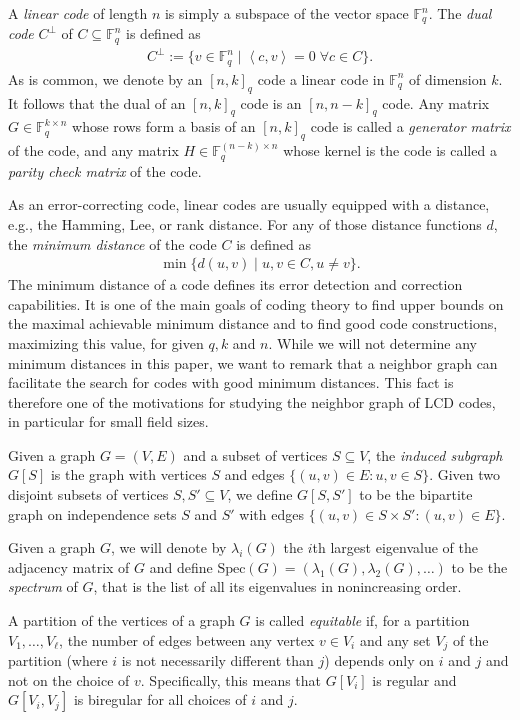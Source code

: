 \documentclass[11pt]{article}
\theoremstyle{definition}
\newcommand{\F}{\mathbb{F}}
\newcommand{\Spec}{\mathrm{Spec}}
\newcommand{\Ang}[1]{\left\langle#1\right\rangle}
\begin{document}
A \emph{linear code} of length $n$ is simply a subspace of the vector space $\F_q^n$.
The \emph{dual code} $C^\perp$ of $C \subseteq \F_q^n$ is defined as
\begin{align*}
	C^\perp := \{v\in \F_q^n \mid \Ang{c, v}=0 \; \forall c\in C\}.
\end{align*}
As is common, we denote by an ${[n, k]}_q$ code a linear code in $\F_q^n$ of dimension $k$.
It follows that the dual of an ${[n, k]}_q$ code is an ${[n, n - k]}_q$ code.
Any matrix $G\in \F_q^{k\times n}$ whose rows form a basis of an ${[n, k]}_q$ code is called a \emph{generator matrix} of the code, and any matrix $H \in \F_q^{(n - k) \times n}$ whose kernel is the code is called a \emph{parity check matrix} of the code.

As an error-correcting code, linear codes are usually equipped with a distance, e.g., the Hamming, Lee, or rank distance.
For any of those distance functions $d$, the \emph{minimum distance} of the code $C$ is defined as 
\begin{align*}
	\min\{d(u, v) \mid u,v \in C, u\neq v\}.
\end{align*}
The minimum distance of a code defines its error detection and correction capabilities.
It is one of the main goals of coding theory to find upper bounds on the maximal achievable minimum distance and to find good code constructions, maximizing this value, for given $q,k$ and $n$.
While we will not determine any minimum distances in this paper, we want to remark that a neighbor graph can facilitate the search for codes with good minimum distances.
This fact is therefore one of the motivations for studying the neighbor graph of LCD codes, in particular for small field sizes.

Given a graph $G = (V, E)$ and a subset of vertices $S \subseteq V$, the \emph{induced subgraph} $G[S]$ is the graph with vertices $S$ and edges $\{(u, v) \in E : u, v \in S\}$.
Given two disjoint subsets of vertices $S, S' \subseteq V$, we define $G[S, S']$ to be the bipartite graph on independence sets $S$ and $S'$ with edges $\{(u, v) \in S \times S' : (u, v) \in E\}$.

Given a graph $G$, we will denote by $\lambda_i(G)$ the $i$th largest eigenvalue of the adjacency matrix of $G$ and define $\Spec(G) = (\lambda_1(G), \lambda_2(G), \ldots)$ to be the \emph{spectrum} of $G$, that is the list of all its eigenvalues in nonincreasing order.

A partition of the vertices of a graph $G$ is called \emph{equitable} if, for a partition $V_1, \ldots, V_\ell$, the number of edges between any vertex $v \in V_i$ and any set $V_j$ of the partition (where $i$ is not necessarily different than $j$) depends only on $i$ and $j$ and not on the choice of $v$.
	Specifically, this means that $G[V_i]$ is regular and $G[V_i, V_j]$ is biregular for all choices of $i$ and $j$.
\end{document}
